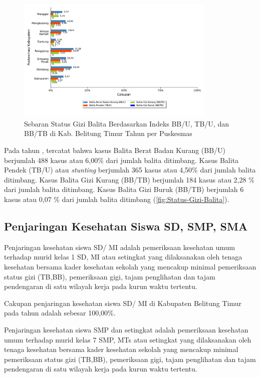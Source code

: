 \begin{figure}[H]
  \centering
  \includegraphics[width=0.85\textwidth]{bab_05/bab_05_25_statusGiziBalita}
  \caption{Sebaran Status Gizi Balita Berdasarkan Indeks BB/U, TB/U, dan BB/TB di Kab. Belitung Timur Tahun \tP per
Puskesmas}
  \label{fig:Status-Gizi-Balita}
\end{figure}

Pada tahun \tP, tercatat bahwa kasus Balita Berat Badan Kurang (BB/U) berjumlah 488 kasus atau 6,00\% dari jumlah balita ditimbang.
Kasus Balita Pendek (TB/U) atau \textit{stunting} berjumlah 365 kasus atau 4,50\% dari jumlah balita ditimbang.
Kasus Balita Gizi Kurang (BB/TB) berjumlah 184 kasus atau 2,28 \% dari jumlah balita ditimbang.
Kasus Balita Gizi Buruk (BB/TB) berjumlah 6 kasus atau 0,07 \% dari jumlah balita ditimbang (\autoref{fig:Status-Gizi-Balita}).

\subsection{Penjaringan Kesehatan Siswa SD, SMP, SMA}
Penjaringan kesehatan siswa SD/ MI adalah pemeriksaan kesehatan umum terhadap murid kelas 1 SD, MI atau setingkat yang dilaksanakan oleh tenaga kesehatan bersama kader kesehatan sekolah yang mencakup minimal pemeriksaan status gizi (TB,BB), pemeriksaan gigi, tajam penglihatan dan tajam pendengaran di satu wilayah kerja pada kurun waktu tertentu.

Cakupan penjaringan kesehatan siswa SD/ MI di Kabupaten Belitung Timur pada tahun \tP adalah sebesar 100,00\%.

Penjaringan kesehatan siswa SMP dan setingkat adalah pemeriksaan kesehatan umum terhadap murid kelas 7 SMP, MTs atau setingkat yang dilaksanakan oleh tenaga kesehatan bersama kader kesehatan sekolah yang mencakup minimal pemeriksaan status gizi (TB,BB), pemeriksaan gigi, tajam penglihatan dan tajam pendengaran di satu wilayah kerja pada kurun waktu tertentu.

